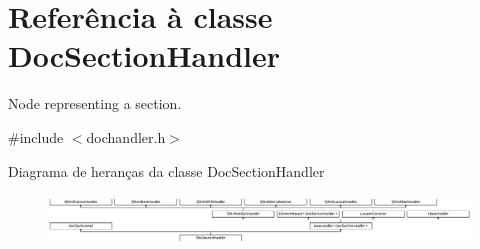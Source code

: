 \hypertarget{class_doc_section_handler}{\section{Referência à classe Doc\-Section\-Handler}
\label{class_doc_section_handler}
}


Node representing a section.  




{\ttfamily \#include $<$dochandler.\-h$>$}

Diagrama de heranças da classe Doc\-Section\-Handler\begin{figure}[H]
\begin{center}
\leavevmode
\includegraphics[height=1.322314cm]{class_doc_section_handler}
\end{center}
\end{figure}
